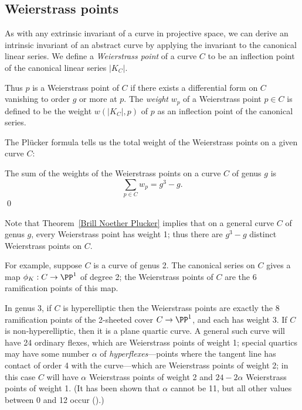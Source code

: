 \subsection{Weierstrass points}

As with any extrinsic invariant of a curve in projective space, we can derive an intrinsic invariant of an abstract curve by applying the invariant to the canonical linear series. We define a \emph{Weierstrass point} of a curve $C$ to be an inflection point of the canonical linear series $|K_C|$. 

Thus $p$ is a Weierstrass point of $C$ if there exists a  differential form on $C$ vanishing to order $g$ or more at $p$. The \emph{weight} $w_p$ of a Weierstrass point $p \in C$  is defined to be the weight $w(|K_C|,p)$ of $p$ as an inflection point of the canonical series. 

The Pl\"ucker formula tells us  the total weight of the Weierstrass points on a given curve $C$:

\begin{corollary}\label{plucker formula}
The sum of the weights of the Weierstrass points on a curve $C$ of genus $g$ is
$$
\sum_{p \in C} w_p = g^3-g.
$$\qed
\end{corollary}

Note that Theorem~\ref{Brill Noether Plucker} implies that on a general curve $C$ of genus $g$, every Weierstrass point has weight 1; thus there are $g^3-g$ distinct Weierstrass points on $C$.


For example, suppose $C$ is a curve of genus 2. The canonical series on $C$ gives a map $\phi_K : C \to \PP^1$ of degree 2; the Weierstrass points of $C$ are the 6 ramification points of this map. 

In genus 3, if $C$ is hyperelliptic then the Weierstrass points are exactly the 8 ramification points of the 2-sheeted cover $C \to \PP^1$, and each has weight 3. If $C$ is non-hyperelliptic, then it is a plane quartic curve. A general such curve will have 24 ordinary flexes, which are Weierstrass points of weight 1; special quartics may have some number $\alpha$ of \emph{hyperflexes}---points where the tangent line has contact of order 4 with the curve---which are Weierstrass points of weight 2; in this case $C$ will have $\alpha$ Weierstrass points of weight 2 and $24-2\alpha$ Weierstrass points of weight 1. (It has been shown that $\alpha$ cannot be 11, but  all  other values  between 0 and 12 occur (\cite{Vermeulen}).)



